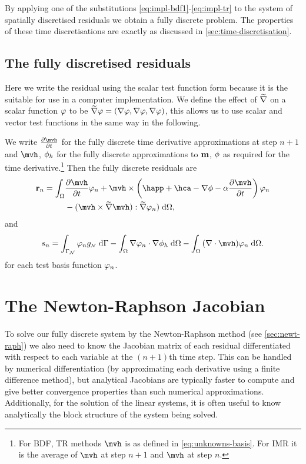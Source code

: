 By applying one of the substitutions \cref{eq:impl-bdf1}-\cref{eq:impl-tr} to the system of spatially discretised residuals we obtain a fully discrete problem.
The properties of these time discretisations are exactly as discussed in \cref{sec:time-discretisation}.

\subsection{The fully discretised residuals}

Here we write the residual using the scalar test function form because it is the suitable for use in a computer implementation.
We define the effect of $\widetilde{\nabla}$ on a scalar function $\varphi$ to be $\widetilde{\nabla} \varphi = (\nabla \varphi, \nabla \varphi, \nabla \varphi)$, this allows us to use scalar and vector test functions in the same way in the following.

We write $\dmdth$ for the fully discrete time derivative approximations at step $n+1$ and $\mvh$, ${\phi}_h$ for the fully discrete approximations to $\boldsymbol{\mathrm{m}}$, $\phi$ as required for the time derivative.\footnote{For BDF, TR methods $\mvh$ is as defined in \cref{eq:unknowns-basis}. For IMR it is the average of $\mvh$ at step $n+1$ and $\mvh$ at step $n$.}
Then the fully discrete residuals are
\begin{equation}
  \label{res:llg-discrete}
  \begin{aligned}
    \rllgv_n = \int_{\magd}
    & \dmdth \tbf_n + \mvh \times \left( \happ + \hca - \grad \phim - \dampc \dmdth
    \right) \tbf_n \\
    &- (\mvh \times \gradv \mvh) : \gradv \tbf_n)
    \d\magd,
  \end{aligned}
\end{equation}
and
\begin{equation}
  \label{res:phi-discrete}
  \begin{aligned}
    \rphi_n = \int_{\boundd_\Neu} \tbf_n g_\Neu \d \boundd
    - \intd{ \grad \tbf_n \cdot \grad \phimh}
    - \intd{ (\div \mvh) \tbf_n}.
  \end{aligned}
\end{equation}
for each test basis function $\varphi_n$.

\section{The Newton-Raphson Jacobian}
\label{sec:llg-jacobian-calculation}

To solve our fully discrete system by the Newton-Raphson method (see \cref{sec:newt-raph}) we also need to know the Jacobian matrix of each residual differentiated with respect to each variable at the $(n+1)$th time step.
This can be handled by numerical differentiation (\eg by approximating each derivative using a finite difference method), but analytical Jacobians are typically faster to compute and give better convergence properties than such numerical approximations.
Additionally, for the solution of the linear systems, it is often useful to know analytically the block structure of the system being solved.

